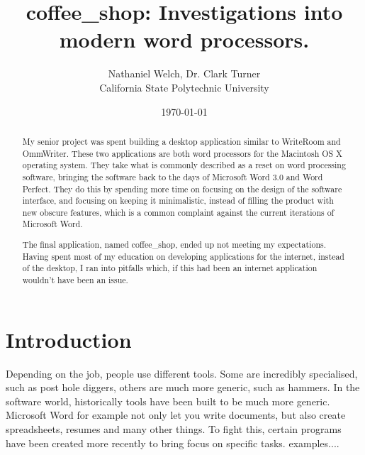 \documentclass[11pt]{article}
\begin{document}
\title{\vfill coffee\_shop: Investigations into modern word processors.} %
\author{
Nathaniel Welch, Dr. Clark Turner\vspace{10pt} \\
California State Polytechnic University\vspace{10pt} \\
}
\date{\today}
\maketitle

\doublespacing

\vfill
\begin{abstract}
My senior project was spent building a desktop application similar to WriteRoom and OmmWriter. These two applications are both word processors for the Macintosh OS X operating system. They take what is commonly described as a reset on word processing software, bringing the software back to the days of Microsoft Word 3.0 and Word Perfect. They do this by spending more time on focusing on the design of the software interface, and focusing on keeping it minimalistic, instead of filling the product with new obscure features, which is a common complaint against the current iterations of Microsoft Word.

The final application, named coffee\_shop, ended up not meeting my expectations. Having spent most of my education on developing applications for the internet, instead of the desktop, I ran into pitfalls which, if this had been an internet application wouldn't have been an issue.
\end{abstract}

\thispagestyle{empty}
% 

\newpage

\section{Introduction}

Depending on the job, people use different tools. Some are incredibly specialised, such as post hole diggers, others are much more generic, such as hammers. In the software world, historically tools have been built to be much more generic. Microsoft Word for example not only let you write documents, but also create spreadsheets, resumes and many other things. To fight this, certain programs have been created more recently to bring focus on specific tasks. examples....
\end{document}
